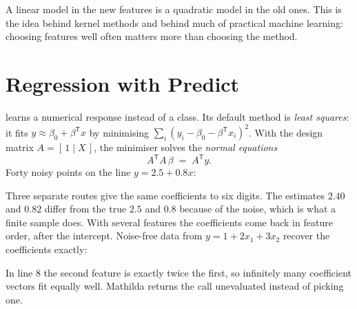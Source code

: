 A linear model in the new features is a quadratic model in the old ones. This is
the idea behind kernel methods and behind much of practical machine learning:
choosing features well often matters more than choosing the method.

\section{Regression with Predict}
\label{sec:ml-predict}

 learns a numerical response instead of a class. Its default method is
\emph{least squares}: it fits
\(y \approx \beta_0 + \beta^{\mathsf T} x\) by minimising
\(\sum_i (y_i - \beta_0 - \beta^{\mathsf T} x_i)^2\). With the design matrix
\(A = [\,1 \mid X\,]\), the minimiser solves the \emph{normal equations}
\[
  A^{\mathsf T} A\, \beta \;=\; A^{\mathsf T} y .
\]
Forty noisy points on the line \(y = 2.5 + 0.8x\):

\begin{codepairs}
\end{codepairs}

Three separate routes give the same coefficients to six digits. The estimates
\(2.40\) and \(0.82\) differ from the true \(2.5\) and \(0.8\) because of the
noise, which is what a finite sample does. With several features the
coefficients come back in feature order, after the intercept. Noise-free data
from \(y = 1 + 2x_1 + 3x_2\) recover the coefficients exactly:

\begin{codepairs}
\end{codepairs}

In line 8 the second feature is exactly twice the first, so infinitely many
coefficient vectors fit equally well. Mathilda returns the call unevaluated
instead of picking one.


